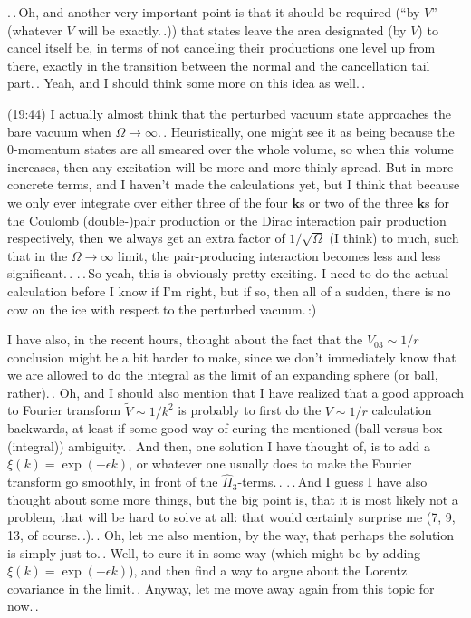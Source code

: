 \documentclass{report}
\begin{document}
.\,.\,Oh, and another very important point is that it should be required (``by $V$'' (whatever $V$ will be exactly.\,.)) that states leave the area designated (by $V$) to cancel itself be, in terms of not canceling their productions one level up from there, exactly in the transition between the normal and the cancellation tail part.\,. Yeah, and I should think some more on this idea as well.\,. %

(19:44) I actually almost think that the perturbed vacuum state approaches the bare vacuum when $\Omega\to\infty$.\,. Heuristically, one might see it as being because the 0-momentum states are all smeared over the whole volume, so when this volume increases, then any excitation will be more and more thinly spread. But in more concrete terms, and I haven't made the calculations yet, but I think that because we only ever integrate over either three of the four $\mathbf{k}$s or two of the three $\mathbf{k}$s for the Coulomb (double-)pair production or the Dirac interaction pair production respectively, then we always get an extra factor of $1/\sqrt{\Omega}$ (I think) to much, such that in the $\Omega\to\infty$ limit, the pair-producing interaction becomes less and less significant.\,. %
.\,.\,So yeah, this is obviously pretty exciting. I need to do the actual calculation before I know if I'm right, but if so, then all of a sudden, there is no cow on the ice with respect to the perturbed vacuum.\,:) %

I have also, in the recent hours, thought about the fact that the $V_{03} \sim 1/r$ conclusion might be a bit harder to make, since we don't immediately know that we are allowed to do the integral as the limit of an expanding sphere (or ball, rather).\,. Oh, and I should also mention that I have realized that a good approach to Fourier transform $\widetilde V \sim 1 / k^2$ is probably to first do the $V \sim 1/r$ calculation backwards, at least if some good way of curing the mentioned (ball-versus-box (integral)) ambiguity.\,. And then, one solution I have thought of, is to add a $\xi(k)=\exp(-\epsilon k)$, or whatever one usually does to make the Fourier transform go smoothly, in front of the $\hat \Pi_3$-terms.\,. %
.\,.\,And I guess I have also thought about some more things, but the big point is, that it is most likely not a problem, that will be hard to solve at all: that would certainly surprise me (7, 9, 13, of course.\,.).\,. Oh, let me also mention, by the way, that perhaps the solution is simply just to.\,. Well, to cure it in some way (which might be by adding $\xi(k)=\exp(-\epsilon k)$), and then find a way to argue about the Lorentz covariance in the limit.\,. Anyway, let me move away again from this topic for now.\,. %
\end{document}
